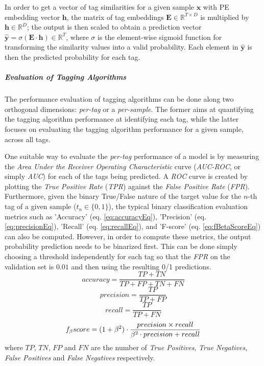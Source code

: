 \documentclass[pdfa%
,cucitura%
]{toptesi}
\begin{document}
In order to get a vector of tag similarities for a given sample $\textbf{x}$ with PE embedding vector $\textbf{h}$, the matrix of tag embeddings $\textbf{E} \in \mathbb{R}^{T \times D}$ is multiplied by $\textbf{h} \in \mathbb{R}^D$; the output is then scaled to obtain a prediction vector $\hat{\textbf{y}} = \sigma(\textbf{E} \cdot \textbf{h}) \in \mathbb{R}^T$, where $\sigma$ is the element-wise sigmoid function for transforming the similarity values into a valid probability. Each element in $\hat{\textbf{y}}$ is then the predicted probability for each tag.

\subparagraph{Evaluation of Tagging Algorithms}
The performance evaluation of tagging algorithms can be done along two orthogonal dimensions: \textit{per-tag} or a \textit{per-sample}. The former aims at quantifying the tagging algorithm performance at identifying each tag, while the latter focuses on evaluating the tagging algorithm performance for a given sample, across all tags.

One suitable way to evaluate the \textit{per-tag} performance of a model is by measuring the \textit{Area Under the Receiver Operating Characteristic} curve (\textit{AUC-ROC}, or simply \textit{AUC}) for each of the tags being predicted. A \textit{ROC} curve is created by plotting the \textit{True Positive Rate} (\textit{TPR}) against the \textit{False Positive Rate} (\textit{FPR}). Furthermore, given the binary True/False nature of the target value for the $n$-th tag of a given sample ($t_n \in \{0, 1\}$), the typical binary classification evaluation metrics such as 'Accuracy' (eq. \ref{eq:accuracyEq}), 'Precision' (eq. \ref{eq:precisionEq}), 'Recall' (eq. \ref{eq:recallEq}), and 'F-score' (eq. \ref{eq:fBetaScoreEq}) can also be computed. However, in order to compute these metrics, the output probability prediction needs to be binarized first. This can be done simply choosing a threshold independently for each tag so that the \textit{FPR} on the validation set is $0.01$ and then using the resulting 0/1 predictions.
\begin{equation} \label{eq:accuracyEq}
	accuracy = \frac{TP + TN}{TP + FP + TN + FN}
\end{equation}
\begin{equation} \label{eq:precisionEq}
	precision = \frac{TP}{TP + FP}
\end{equation}
\begin{equation} \label{eq:recallEq}
	recall = \frac{TP}{TP + FN}
\end{equation}
\begin{equation} \label{eq:fBetaScoreEq}
	f_\beta\-score = (1 + \beta^2) \cdot \frac{precision \times recall}{\beta^2 \cdot precision + recall}
\end{equation}
where $TP$, $TN$, $FP$ and $FN$ are the number of \textit{True Positives}, \textit{True Negatives}, \textit{False Positives} and \textit{False Negatives} respectively.
\end{document}
